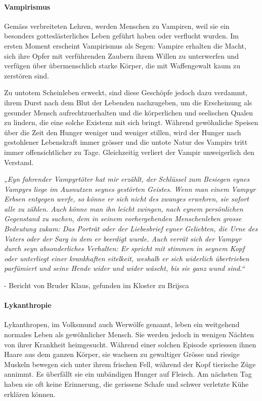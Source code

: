 \documentclass[10pt,twoside,twocolumn,openany]{book}
\begin{document}
\begin{multicols}{2}
\paragraph{Vampirismus}
Gemäss verbreiteten Lehren, werden Menschen zu Vampiren, weil sie ein besonders gotteslästerliches Leben geführt haben oder verflucht wurden. Im ersten Moment erscheint Vampirismus als Segen: Vampire erhalten die Macht, sich ihre Opfer mit verführenden Zaubern ihrem Willen zu unterwerfen und verfügen über übermenschlich starke Körper, die mit Waffengewalt kaum zu zerstören sind.

Zu untotem Scheinleben erweckt, sind diese Geschöpfe jedoch dazu verdammt, ihrem Durst nach dem Blut der Lebenden nachzugeben, um die Erscheinung als gesunder Mensch aufrechtzuerhalten und die körperlichen und seelischen Qualen zu lindern, die eine solche Existenz mit sich bringt. Während gewöhnliche Speisen über die Zeit den Hunger weniger und weniger stillen, wird der Hunger nach gestohlener Lebenskraft immer grösser und die untote Natur des Vampirs tritt immer offensichtlicher zu Tage. Gleichzeitig verliert der Vampir unweigerlich den Verstand.

\quad

\textit{„Eyn fahrender Vampyrtöter hat mir erzählt, der Schlüssel zum Besiegen eynes Vampyrs liege im Ausnutzen seynes gestörten Geistes. Wenn man einem Vampyr Erbsen entgegen werfe, so könne er sich nicht des zwanges erwehren, sie sofort alle zu zählen. Auch könne man ihn leicht zwingen, nach eynem  persönlichen Gegenstand zu suchen, dem in seinem vorhergehenden Menschenleben grosse Bedeutung zukam: Das Porträt oder der Liebesbrief eyner Geliebten, die Urne des Vaters oder der Sarg in dem er beerdigt wurde.
Auch verrät sich der Vampyr durch seyn absonderliches Verhalten: Er spricht mit stimmen in seynem Kopf oder unterliegt einer krankhaften eitelkeit, weshalb er sich widerlich übertrieben parfümiert und seine Hende wider und wider wäscht, bis sie ganz wund sind.“}
\begin{flushright}
	- Bericht von Bruder Klaus, gefunden im Kloster zu Brijsca
\end{flushright}


\paragraph{Lykanthropie}
Lykanthropen, im Volksmund auch Werwölfe genannt, leben ein weitgehend normales Leben als gewöhnlicher Mensch. Sie werden jedoch in wenigen Nächten von ihrer Krankheit heimgesucht. Während einer solchen Episode spriessen ihnen Haare aus dem ganzen Körper, sie wachsen zu gewaltiger Grösse und riesige Muskeln bewegen sich unter ihrem frischen Fell, während der Kopf tierische Züge annimmt. Es überfällt sie ein unbändigen Hunger auf Fleisch. Am nächsten Tag haben sie oft keine Erinnerung, die gerissene Schafe und schwer verletzte Kühe erklären können.

\end{multicols}
\end{document}
